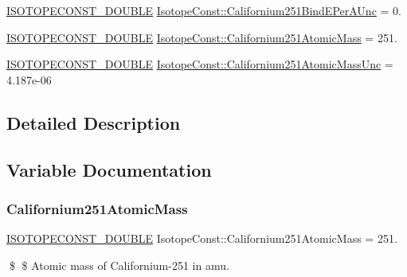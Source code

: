 \begin{DoxyCompactItemize}
\item 
\mbox{\hyperlink{group___isotope_const-_macros_ga8f45a7272ce02c0b4c65c44636ed719a}{I\+S\+O\+T\+O\+P\+E\+C\+O\+N\+S\+T\+\_\+\+D\+O\+U\+B\+LE}} \mbox{\hyperlink{group___isotope_const-_californium-_cf251_gaca12b0d22a8d8c72e9841da2c1a95330}{Isotope\+Const\+::\+Californium251\+Bind\+E\+Per\+A\+Unc}} = 0.
\item 
\mbox{\hyperlink{group___isotope_const-_macros_ga8f45a7272ce02c0b4c65c44636ed719a}{I\+S\+O\+T\+O\+P\+E\+C\+O\+N\+S\+T\+\_\+\+D\+O\+U\+B\+LE}} \mbox{\hyperlink{group___isotope_const-_californium-_cf251_ga5a3b96c23bc95a79243dda0f3bc72426}{Isotope\+Const\+::\+Californium251\+Atomic\+Mass}} = 251.
\item 
\mbox{\hyperlink{group___isotope_const-_macros_ga8f45a7272ce02c0b4c65c44636ed719a}{I\+S\+O\+T\+O\+P\+E\+C\+O\+N\+S\+T\+\_\+\+D\+O\+U\+B\+LE}} \mbox{\hyperlink{group___isotope_const-_californium-_cf251_ga7bf4986d24342cf70c9fde21729b6ce6}{Isotope\+Const\+::\+Californium251\+Atomic\+Mass\+Unc}} = 4.\+187e-\/06
\end{DoxyCompactItemize}


\subsection{Detailed Description}


\subsection{Variable Documentation}
\mbox{\label{group___isotope_const-_californium-_cf251_ga5a3b96c23bc95a79243dda0f3bc72426}} 
\subsubsection{\texorpdfstring{Californium251\+Atomic\+Mass}{Californium251AtomicMass}}
{\footnotesize\ttfamily \mbox{\hyperlink{group___isotope_const-_macros_ga8f45a7272ce02c0b4c65c44636ed719a}{I\+S\+O\+T\+O\+P\+E\+C\+O\+N\+S\+T\+\_\+\+D\+O\+U\+B\+LE}} Isotope\+Const\+::\+Californium251\+Atomic\+Mass = 251.}

\$ \$ Atomic mass of Californium-\/251 in amu. \mbox{\label{group___isotope_const-_californium-_cf251_ga7bf4986d24342cf70c9fde21729b6ce6}} 
